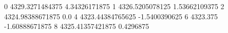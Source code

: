 0 4329.3271484375 4.34326171875
1 4326.5205078125 1.53662109375
2 4324.98388671875 0.0
4 4323.44384765625 -1.5400390625
6 4323.375 -1.60888671875
8 4325.41357421875 0.4296875
